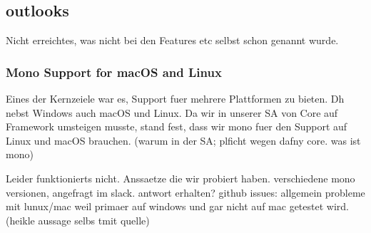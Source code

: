 \subsection{outlooks}
Nicht erreichtes, was nicht bei den Features etc selbst schon genannt wurde.

\subsubsection{Mono Support for macOS and Linux}
Eines der Kernzeiele war es, Support fuer mehrere Plattformen zu bieten. Dh nebst Windows auch macOS und Linux.
Da wir in unserer SA von Core auf Framework umsteigen musste, stand fest, dass wir mono fuer den Support auf Linux und macOS brauchen.
(warum in der SA; plficht wegen dafny core. was ist mono)

Leider funktionierts nicht.
Anssaetze die wir probiert haben. verschiedene mono versionen, angefragt im slack. antwort erhalten?
github issues: allgemein probleme mit lunux/mac weil primaer auf windows und gar nicht auf mac getestet wird. (heikle aussage selbs tmit quelle)

\cite{sa}
\cite{mono-slack}
\cite{mono-git}
